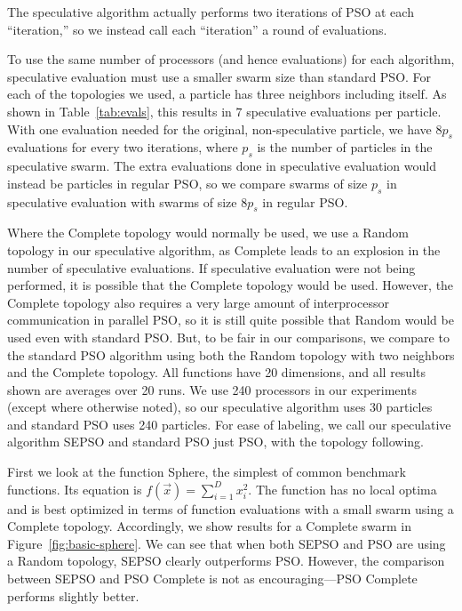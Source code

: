 \documentclass[journal,letterpaper]{IEEEtran}
\newcommand{\fig}[1]{Figure~\ref{fig:#1}}
\begin{document}
The speculative algorithm actually performs two iterations of PSO at each
``iteration,'' so we instead call each ``iteration'' a round of evaluations.

To use the same number of processors (and hence evaluations) for each
algorithm, speculative evaluation must use a smaller swarm size than standard
PSO.  For each of the topologies we used, a particle has three neighbors
including itself.  As shown in Table~\ref{tab:evals}, this results in $7$
speculative evaluations per particle.  With one evaluation needed for the
original, non-speculative particle, we have $8p_s$ evaluations for every two
iterations, where $p_s$ is the number of particles in the speculative swarm.
The extra evaluations done in speculative evaluation would instead be particles
in regular PSO, so we compare swarms of size $p_s$ in speculative evaluation
with swarms of size $8p_s$ in regular PSO.

Where the Complete topology would normally be used, we use a Random topology in
our speculative algorithm, as Complete leads to an explosion in the number of
speculative evaluations.  If speculative evaluation were not being performed,
it is possible that the Complete topology would be used.  However, the Complete
topology also requires a very large amount of interprocessor communication in
parallel PSO, so it is still quite possible that Random would be used even with
standard PSO.  But, to be fair in our comparisons, we compare to the standard
PSO algorithm using both the Random topology with two neighbors and the
Complete topology.  All functions have 20 dimensions, and all results shown are
averages over 20 runs.  We use 240 processors in our experiments (except where
otherwise noted), so our speculative algorithm uses 30 particles and standard
PSO uses 240 particles.  For ease of labeling, we call our speculative
algorithm SEPSO and standard PSO just PSO, with the topology following.

First we look at the function Sphere, the simplest of common benchmark
functions.  Its equation is $f(\Vec{x}) = \sum_{i=1}^D x_i^2$.  The function
has no local optima and is best optimized in terms of function evaluations with
a small swarm using a Complete topology.  Accordingly, we show results for a
Complete swarm in \fig{basic-sphere}.  We can see that when both SEPSO and PSO
are using a Random topology, SEPSO clearly outperforms PSO.  However, the
comparison between SEPSO and PSO Complete is not as encouraging---PSO Complete
performs slightly better.
\end{document}
